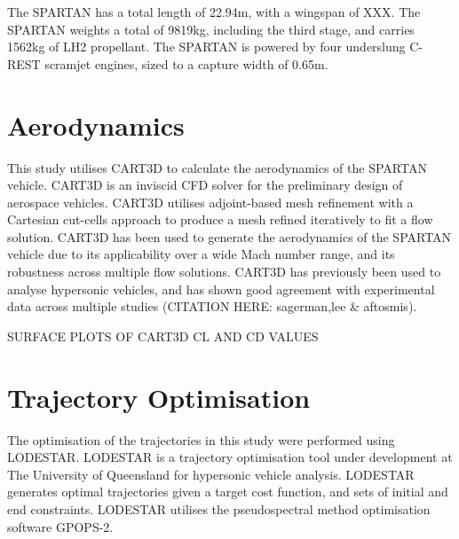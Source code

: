 \documentclass[conf]{new-aiaa}
\begin{document}
The SPARTAN has a total length of 22.94m, with a wingspan of XXX. The SPARTAN weights a total of 9819kg, including the third stage, and carries 1562kg of LH2 propellant. The SPARTAN is powered by four underslung C-REST scramjet engines, sized to a capture width of 0.65m.






\section{Aerodynamics}
 This study utilises CART3D to calculate the aerodynamics of the SPARTAN vehicle. CART3D is an inviscid CFD solver for the preliminary design of aerospace vehicles. CART3D utilises adjoint-based mesh refinement with a Cartesian cut-cells approach to produce a mesh refined iteratively to fit a flow solution. CART3D has been used to generate the aerodynamics of the SPARTAN vehicle due to its applicability over a wide Mach number range, and its robustness across multiple flow solutions. CART3D has previously been used to analyse hypersonic vehicles, and has shown good agreement with experimental data across multiple studies (CITATION HERE: sagerman,lee \& aftosmis).
 

SURFACE PLOTS OF CART3D CL AND CD VALUES

\section{Trajectory Optimisation}
The optimisation of the trajectories in this study were performed using LODESTAR. LODESTAR is a trajectory optimisation tool under development at The University of Queensland for hypersonic vehicle analysis. LODESTAR generates optimal trajectories given a target cost function, and sets of initial and end constraints. LODESTAR utilises the pseudospectral method optimisation software GPOPS-2. 
\end{document}
